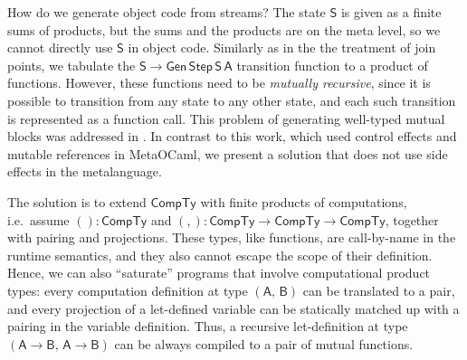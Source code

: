 \documentclass[acmsmall,screen]{acmart}
\newcommand{\msf}[1]{{\mathsf{#1}}}
\newcommand{\vA}{\mathsf{A}}
\newcommand{\vB}{\mathsf{B}}
\newcommand{\vS}{\mathsf{S}}
\newcommand{\CTy}{\msf{CompTy}}
\theoremstyle{remark}
\newcommand{\Gen}{\msf{Gen}}
\newcommand{\Step}{\msf{Step}}
\begin{document}
How do we generate object code from streams? The state $\vS$ is given as a
finite sums of products, but the sums and the products are on the meta level, so
we cannot directly use $\vS$ in object code. Similarly as in the the treatment
of join points, we tabulate the $\vS \to \Gen\,\Step\,\vS\,\vA$ transition
function to a product of functions. However, these functions need to be
\emph{mutually recursive}, since it is possible to transition from any state to
any other state, and each such transition is represented as a function call.
This problem of generating well-typed mutual blocks was addressed in
\cite{DBLP:conf/pepm/YallopK19}. In contrast to this work, which used control
effects and mutable references in MetaOCaml, we present a solution that does not
use side effects in the metalanguage.


The solution is to extend $\CTy$ with finite products of computations,
i.e.\ assume $() : \CTy$ and $({,}) : \CTy \to \CTy \to \CTy$, together with
pairing and projections. These types, like functions, are call-by-name in the
runtime semantics, and they also cannot escape the scope of their definition.
Hence, we can also ``saturate'' programs that involve computational product types:
every computation definition at type $(\vA,\,\vB)$ can be translated to a pair,
and every projection of a let-defined variable can be statically matched up with
a pairing in the variable definition. Thus, a recursive let-definition at type
$(\vA \to \vB,\,\vA \to \vB)$ can be always compiled to a pair of mutual
functions.
\end{document}
